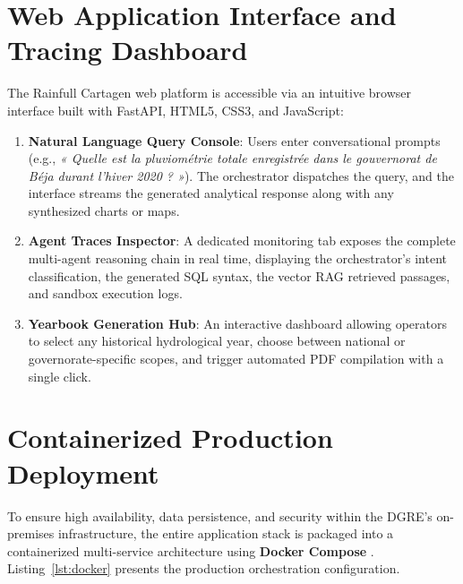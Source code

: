 \documentclass[12pt,a4paper]{report}
\begin{document}
\section{Web Application Interface and Tracing Dashboard}

The Rainfull Cartagen web platform is accessible via an intuitive browser interface built with FastAPI, HTML5, CSS3, and JavaScript:
\begin{enumerate}
  \item \textbf{Natural Language Query Console}: Users enter conversational prompts (e.g., \textit{« Quelle est la pluviométrie totale enregistrée dans le gouvernorat de Béja durant l'hiver 2020 ? »}). The orchestrator dispatches the query, and the interface streams the generated analytical response along with any synthesized charts or maps.
  \item \textbf{Agent Traces Inspector}: A dedicated monitoring tab exposes the complete multi-agent reasoning chain in real time, displaying the orchestrator's intent classification, the generated SQL syntax, the vector RAG retrieved passages, and sandbox execution logs.
  \item \textbf{Yearbook Generation Hub}: An interactive dashboard allowing operators to select any historical hydrological year, choose between national or governorate-specific scopes, and trigger automated PDF compilation with a single click.
\end{enumerate}

\section{Containerized Production Deployment}

To ensure high availability, data persistence, and security within the DGRE's on-premises infrastructure, the entire application stack is packaged into a containerized multi-service architecture using \textbf{Docker Compose} \cite{docker2024}. Listing~\ref{lst:docker} presents the production orchestration configuration.
\end{document}
